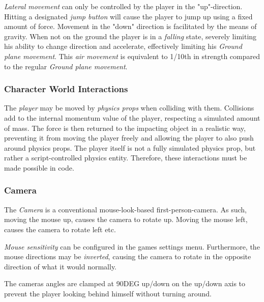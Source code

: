 \documentclass[10pt,a4paper]{article}
\begin{document}
\emph{Lateral movement} can only be controlled by the player in the "up"-direction. Hitting a designated \emph{jump button} will cause the player to jump up using a fixed amount of force. Movement in the "down" direction is facilitated by the means of gravity. When not on the ground the player is in a \emph{falling} state, severely limiting his ability to change direction and accelerate, effectively limiting his \emph{Ground plane movement}. This \emph{air movement} is equivalent to 1/10th in strength compared to the regular \emph{Ground plane movement}.

\subsubsection{Character World Interactions}
\label{Character World Interactions}
The \emph{player} may be moved by \emph{physics props} when colliding with them. Collisions add to the internal momentum value of the player, respecting a simulated amount of mass. The force is then returned to the impacting object in a realistic way, preventing it from moving the player freely and allowing the player to also push around physics props. The player itself is not a fully simulated physics prop, but rather a script-controlled physics entity. Therefore, these interactions must be made possible in code. 

\subsubsection{Camera}
The \emph{Camera} is a conventional mouse-look-based first-person-camera. As such, moving the mouse up, causes the camera to rotate up. Moving the mouse left, causes the camera to rotate left etc. 

\emph{Mouse sensitivity} can be configured in the games settings menu. Furthermore, the mouse directions may be \emph{inverted}, causing the camera to rotate in the opposite direction of what it would normally.

The cameras angles are clamped at 90DEG up/down on the up/down axis to prevent the player looking behind himself without turning around.
\end{document}
